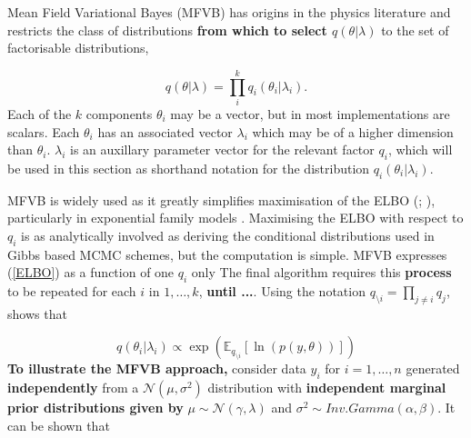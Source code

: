 \documentclass[12pt,a4paper]{article}%
\numberwithin{equation}{section}
\begin{document}
Mean Field Variational Bayes (MFVB) has origins in the physics literature \citep{Chandler1987} and restricts the class of distributions {\bf from which to select $q(\theta|\lambda)$} to the set of factorisable distributions,

\begin{equation}
\label{mf1}
q(\theta|\lambda) = \prod_i^k q_i(\theta_i | \lambda_i).
\end{equation}
Each of the $k$ components $\theta_i$ may be a vector, but in most implementations are scalars. Each $\theta_i$ has an associated vector $\lambda_i$ which may be of a higher dimension than $\theta_i$. $\lambda_i$ is an auxillary parameter vector for the relevant factor $q_i$, which will be used in this section as shorthand notation for the distribution $q_i(\theta_i |\lambda_i)$. 

MFVB is widely used as it greatly simplifies maximisation of the ELBO (\citealp{Jordan1999}; \citealp{Bishop2006}), particularly in exponential family models \citep{Wainwright2008}.  Maximising the ELBO with respect to $q_i$ is as analytically involved as deriving the conditional distributions used in Gibbs based MCMC schemes, but the computation is simple. 
MFVB expresses (\ref{ELBO}) as a function of one $q_i$ only 
The final algorithm requires this {\bf process} to be repeated for each $i$ in $1, \dots, k$, {\bf until ...}.
Using the notation $q_{\setminus i} = \prod_{j\neq i}q_j$, \citet{Attias1999} shows that 

\begin{equation}
\label{mf2}
q(\theta_i | \lambda_i) \propto\exp( \mathbb{E}_{q_{\setminus i}} [\ln(p(y,\theta))])
\end{equation}
{\bf To illustrate the MFVB approach,} consider data $y_i$ for $i = 1, \dots, n$ generated {\bf independently} from a $\mathcal{N}(\mu, \sigma^2)$ distribution with {\bf independent marginal prior distributions given by} %
$\mu \sim \mathcal{N}(\gamma, \lambda)$ and $\sigma^2 \sim Inv.Gamma(\alpha, \beta)$. It can be shown that
\end{document}

